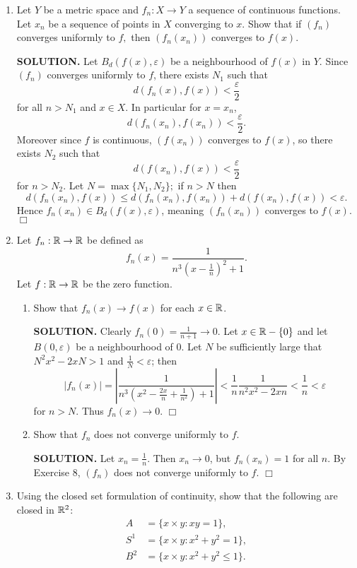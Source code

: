 \documentclass{article}
\begin{document}
\begin{enumerate}
    \item Let $Y$ be a metric space and $f_n:X \rightarrow Y$ a sequence of continuous functions. Let $x_n$ be a sequence of points in $X$ converging to $x$. Show that if $(f_n)$ converges uniformly to $f,$ then $(f_n(x_n))$ converges to $f(x)$.

    {\bf SOLUTION.} Let $B_d(f(x), \varepsilon)$ be a neighbourhood of $f(x)$ in $Y$. Since $(f_n)$ converges uniformly to $f$, there exists $N_1$ such that
    $$d(f_n(x), f(x)) < \frac{\varepsilon}{2}$$
    for all $n > N_1$ and $x \in X$. In particular for $x = x_n$,
    $$d(f_n(x_n), f(x_n)) < \frac{\varepsilon}{2}.$$
    Moreover since $f$ is continuous, $(f(x_n))$ converges to $f(x)$, so there exists $N_2$ such that
    $$d(f(x_n), f(x)) < \frac{\varepsilon}{2}$$
    for $n > N_2$. Let $N = \max \{N_1, N_2\};$ if $n > N$ then
    $$d(f_n(x_n), f(x)) \leq d(f_n(x_n), f(x_n)) + d(f(x_n), f(x)) < \varepsilon.$$
    Hence $f_n(x_n) \in B_d(f(x), \varepsilon)$, meaning $(f_n(x_n))$ converges to $f(x)$. $\Box$

    \item Let $f_n: \mathbb{R} \rightarrow \mathbb{R}$ be defined as
    $$f_n(x) = \frac{1}{n^3(x-\frac{1}{n})^2 + 1}.$$
    Let $f: \mathbb{R} \rightarrow \mathbb{R}$ be the zero function.
    \begin{enumerate}
        \item Show that $f_n(x) \rightarrow f(x)$ for each $x \in \mathbb{R}$.

        {\bf SOLUTION.} Clearly $f_n(0) = \frac{1}{n+1} \rightarrow 0$. Let $x \in \mathbb{R} - \{0\}$ and let $B(0, \varepsilon)$ be a neighbourhood of $0$. Let $N$ be sufficiently large that $N^2x^2 - 2xN > 1$ and $\frac1N < \varepsilon$; then
        $$|f_n(x)| = \left| \frac{1}{n^3(x^2- \frac{2x}{n}+\frac{1}{n^2})+1} \right| < \frac1n \frac{1}{n^2x^2-2xn} < \frac1n < \varepsilon$$
        for $n > N$. Thus $f_n(x) \rightarrow 0$. $\Box$
        
        \item Show that $f_n$ does not converge uniformly to $f$.

        {\bf SOLUTION.} Let $x_n = \frac1n$. Then $x_n \rightarrow 0$, but $f_n(x_n) = 1$ for all $n$. By Exercise 8, $(f_n)$ does not converge uniformly to $f$. $\Box$
    \end{enumerate}

    \item Using the closed set formulation of continuity, show that the following are closed in $\mathbb{R}^2$:
    \begin{align*}
        A &= \{x \times y: xy = 1\}, \\
        S^1 &= \{x \times y: x^2+ y^2 = 1\}, \\
        B^2 &= \{x \times y: x^2+ y^2 \leq 1\}.
    \end{align*}


\end{enumerate}
\end{document}
